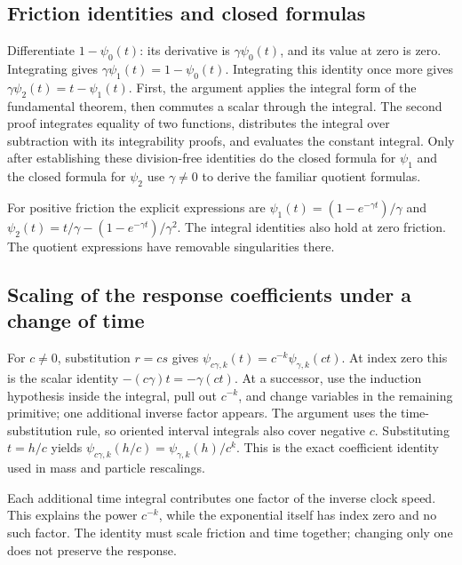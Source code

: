 \documentclass[11pt,a4paper]{report}
\begin{document}
\subsection{\texorpdfstring{Friction identities and closed formulas}{Friction identities and closed formulas}}
\label{report-step-KineticLangevin-Coefficients-lean-2}


Differentiate \(1-\psi_0(t)\): its derivative is \(\gamma\psi_0(t)\), and its value at zero is zero. Integrating gives \(\gamma\psi_1(t)=1-\psi_0(t)\). Integrating this identity once more gives \(\gamma\psi_2(t)=t-\psi_1(t)\). First, the argument applies the integral form of the fundamental theorem, then commutes a scalar through the integral. The second proof integrates equality of two functions, distributes the integral over subtraction with its integrability proofs, and evaluates the constant integral. Only after establishing these division-free identities do the closed formula for \(\psi_1\) and the closed formula for \(\psi_2\) use \(\gamma\ne0\) to derive the familiar quotient formulas.



For positive friction the explicit expressions are \(\psi_1(t)=(1-e^{-\gamma t})/\gamma\) and \(\psi_2(t)=t/\gamma-(1-e^{-\gamma t})/\gamma^2\). The integral identities also hold at zero friction. The quotient expressions have removable singularities there.

\subsection{\texorpdfstring{Scaling of the response coefficients under a change of time}{Scaling of the response coefficients under a change of time}}
\label{report-step-KineticLangevin-Coefficients-lean-3}


For \(c\ne0\), substitution \(r=cs\) gives \(\psi_{c\gamma,k}(t)=c^{-k}\psi_{\gamma,k}(ct)\). At index zero this is the scalar identity \(-(c\gamma)t=-\gamma(ct)\). At a successor, use the induction hypothesis inside the integral, pull out \(c^{-k}\), and change variables in the remaining primitive; one additional inverse factor appears. The argument uses the time-substitution rule, so oriented interval integrals also cover negative \(c\). Substituting \(t=h/c\) yields \(\psi_{c\gamma,k}(h/c)=\psi_{\gamma,k}(h)/c^k\). This is the exact coefficient identity used in mass and particle rescalings.



Each additional time integral contributes one factor of the inverse clock speed. This explains the power \(c^{-k}\), while the exponential itself has index zero and no such factor. The identity must scale friction and time together; changing only one does not preserve the response.
\end{document}
